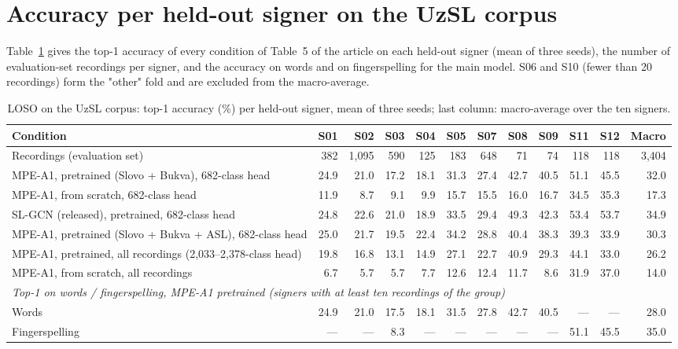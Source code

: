 \documentclass[a4paper,10pt]{article}
\begin{document}
\section{Accuracy per held-out signer on the UzSL corpus}
Table~\ref{tab:s_loso} gives the top-1 accuracy of every condition of Table~5 of the article on each held-out signer (mean of three seeds), the number of evaluation-set recordings per signer, and the accuracy on words and on fingerspelling for the main model. S06 and S10 (fewer than 20 recordings) form the "other" fold and are excluded from the macro-average.
\begin{table}[H]
\caption{LOSO on the UzSL corpus: top-1 accuracy (\%) per held-out signer, mean of three seeds; last column: macro-average over the ten signers.}\label{tab:s_loso}
\centering
\scriptsize
\begin{tabular}{lrrrrrrrrrrr}
\toprule
\textbf{Condition} & \textbf{S01} & \textbf{S02} & \textbf{S03} & \textbf{S04} & \textbf{S05} & \textbf{S07} & \textbf{S08} & \textbf{S09} & \textbf{S11} & \textbf{S12} & \textbf{Macro} \\
\midrule
Recordings (evaluation set) & 382 & 1,095 & 590 & 125 & 183 & 648 & 71 & 74 & 118 & 118 & 3,404 \\
MPE-A1, pretrained (Slovo + Bukva), 682-class head & 24.9 & 21.0 & 17.2 & 18.1 & 31.3 & 27.4 & 42.7 & 40.5 & 51.1 & 45.5 & 32.0 \\
MPE-A1, from scratch, 682-class head & 11.9 & 8.7 & 9.1 & 9.9 & 15.7 & 15.5 & 16.0 & 16.7 & 34.5 & 35.3 & 17.3 \\
SL-GCN (released), pretrained, 682-class head & 24.8 & 22.6 & 21.0 & 18.9 & 33.5 & 29.4 & 49.3 & 42.3 & 53.4 & 53.7 & 34.9 \\
MPE-A1, pretrained (Slovo + Bukva + ASL), 682-class head & 25.0 & 21.7 & 19.5 & 22.4 & 34.2 & 28.8 & 40.4 & 38.3 & 39.3 & 33.9 & 30.3 \\
MPE-A1, pretrained, all recordings (2,033–2,378-class head) & 19.8 & 16.8 & 13.1 & 14.9 & 27.1 & 22.7 & 40.9 & 29.3 & 44.1 & 33.0 & 26.2 \\
MPE-A1, from scratch, all recordings & 6.7 & 5.7 & 5.7 & 7.7 & 12.6 & 12.4 & 11.7 & 8.6 & 31.9 & 37.0 & 14.0 \\
\multicolumn{12}{l}{\textit{Top-1 on words / fingerspelling, MPE-A1 pretrained (signers with at least ten recordings of the group)}} \\
Words & 24.9 & 21.0 & 17.5 & 18.1 & 31.5 & 27.8 & 42.7 & 40.5 & --- & --- & 28.0 \\
Fingerspelling & --- & --- & 8.3 & --- & --- & --- & --- & --- & 51.1 & 45.5 & 35.0 \\
\bottomrule
\end{tabular}
\end{table}
\end{document}
